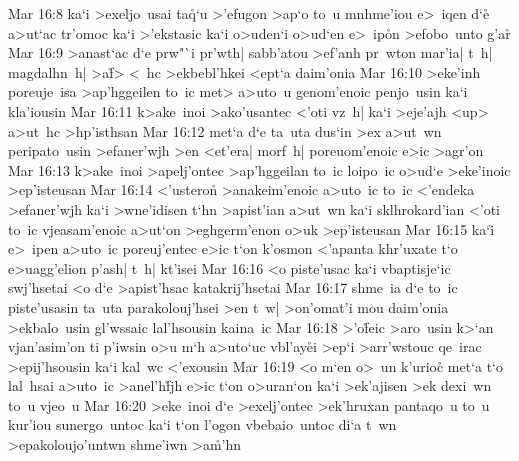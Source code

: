\vs Mar 16:8
ka`i
>exeljo~usai
ta\r{q}`u
>'efugon
>ap`o
to~u
mnhme'iou
e>~iqen
d`e\r{}
a>ut`ac
tr'omoc
ka`i
>'ekstasic
ka`i
o>uden`i
o>ud`en
e>~ip\r{o}n
>efobo~unto
g'a\r{r}\bibvsend
{}
\vs Mar 16:9
>anast`ac
d`e
prw"`i
pr'wth|
sabb'atou
>ef'anh
pr~wton
mar'ia|
t~h|
magdalhn~h|
>a\r{f}>
<~hc
>ekbebl'hkei
<ept`a
daim'onia\bibvsend
\vs Mar 16:10
>eke'inh
poreuje~isa
>ap'hggeilen
to~ic
met>
a>uto~u
genom'enoic
penjo~usin
ka`i
kla'iousin\bibvsend
\vs Mar 16:11
k>ake~inoi
>ako'usantec
<'oti
vz~h|
ka`i
>eje'ajh
<up>
a>ut~hc
>hp'isthsan\bibvsend
\vs Mar 16:12
met`a
d`e
ta~uta
dus`in
>ex
a>ut~wn
peripato~usin
>efaner'wjh
>en
<et'era|
morf~h|
poreuom'enoic
e>ic
>agr'on\bibvsend
\vs Mar 16:13
k>ake~inoi
>apelj'ontec
>ap'hggeilan
to~ic
loipo~ic
o>ud`e
>eke'inoic
>ep'isteusan\bibvsend
\vs Mar 16:14
<'ustero\r{n}
>anakeim'enoic
a>uto~ic
to~ic
<'endeka
>efaner'wjh
ka`i
>wne'idisen
t`hn
>apist'ian
a>ut~wn
ka`i
sklhrokard'ian
<'oti
to~ic
vjeasam'enoic
a>ut`on
>eghgerm'enon
o>uk
>ep'isteusan\bibvsend
\vs Mar 16:15
ka`i\r{}
e>~ipen
a>uto~ic
poreuj'entec
e>ic
t`on
k'osmon
<'apanta
khr'uxate
t`o
e>uagg'elion
p'ash|
t~h|
kt'isei\bibvsend
\vs Mar 16:16
<o
piste'usac
ka`i
vbaptisje`ic
swj'hsetai
<o
d`e
>apist'hsac
katakrij'hsetai\bibvsend
\vs Mar 16:17
shme~ia
d`e
to~ic
piste'usasin
ta~uta
parakolouj'hsei
>en
t~w|
>on'omat'i
mou
daim'onia
>ekbalo~usin
gl'wssaic
lal'hsousin
kaina~ic\bibvsend
\vs Mar 16:18
>'o\r{f}eic
>aro~usin
k>`an
vjan'asim'on
ti
p'iwsin
o>u
m`h
a>uto`uc
vbl'ay\r{e}i
>ep`i
>arr'wstouc
qe~irac
>epij'hsousin
ka`i
kal~wc
<'exousin\bibvsend
\vs Mar 16:19
<o
m`en
o>~un
k'urio\r{c}
met`a
t`o
lal~hsai
a>uto~ic
>anel'h\r{f}jh
e>ic
t`on
o>uran`on
ka`i
>ek'ajisen
>ek
dexi~wn
to~u
vjeo~u\bibvsend
\vs Mar 16:20
>eke~inoi
d`e
>exelj'ontec
>ek'hruxan
pantaqo~u
to~u
kur'iou
sunergo~untoc
ka`i
t`on
l'ogon
vbebaio~untoc
di`a
t~wn
>epakoloujo'untwn
shme'iwn
>a\r{m}'hn\bibvsend
{}
